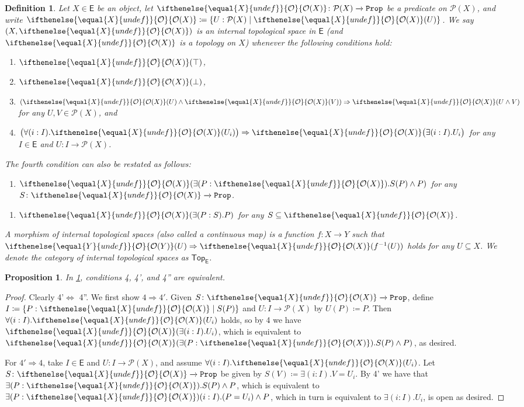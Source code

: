 \documentclass[reqno,11pt]{amsproc}
\theoremstyle{plain}
\newtheorem{proposition}[theorem]{Proposition}
\newtheorem{definition}[theorem]{Definition}
\theoremstyle{definition}
\newcommand{\Const}[1]{\mathtt{#1}}
\newcommand{\cat}[1]{\mathsf{#1}}
\newcommand{\Top}{\cat{Top}}
\renewcommand{\to}[1][]{\xrightarrow{#1}}
\newcommand{\pow}{\mathcal{P}}
\newcommand{\prop}{\Const{Prop}}
\newcommand{\Op}[1][undef]{\ifthenelse{\equal{#1}{undef}}{\mathcal{O}}{\mathcal{O}(#1)}}
\newcommand{\imp}{\Rightarrow}
\renewcommand{\iff}{\Leftrightarrow}
\numberwithin{equation}{section}
\begin{document}
\begin{definition}\label{def.internal_space}
	Let $X\in\cat{E}$ be an object, let $\Op[X]\colon\pow(X)\to\prop$ be a predicate on $\pow(X)$, and write $\Op[X]\coloneq\{U:\pow(X)\mid\Op[X](U)\}$. We say $(X,\Op[X])$ is an \emph{internal topological space in $\cat{E}$} (and $\Op[X]$ is a \emph{topology on $X$}) whenever the following conditions hold:
\begin{enumerate}
	\item $\Op[X](\top)$,
	\item $\Op[X](\bot)$,
	\item $(\Op[X](U)\wedge\Op[X](V))\imp \Op[X](U\wedge V)$ for any $U,V\in\pow(X)$, and
	\item $\big(\forall(i:I).\Op[X](U_i)\big)\imp\Op[X]\big(\exists(i:I).U_i\big)$ for any $I\in\cat{E}$ and $U\colon I\to\pow(X)$.
\end{enumerate}
The fourth condition can also be restated as follows:
\begin{enumerate}[label=4'.]
	\item $\Op[X](\exists(P:\Op[X]).S(P)\wedge P)$ for any $S\colon\Op[X]\to\prop$. 
\end{enumerate}
\begin{enumerate}[label=4''.]
	\item $\Op[X](\exists(P:S).P)$ for any $S\subseteq\Op[X]$.
\end{enumerate}

A \emph{morphism of internal topological spaces} (also called a \emph{continuous map}) is a function $f\colon X\to Y$ such that $\Op[Y](U)\imp\Op[X](f^{-1}(U))$ holds for any $U\subseteq X$. We denote the category of internal topological spaces as $\Top_\cat{E}$.
\end{definition}

\begin{proposition}
In \cref{def.internal_space}, conditions 4, 4', and 4'' are equivalent.
\end{proposition}
\begin{proof}
Clearly 4'$\iff$ 4''. We first show $4\imp 4'$. Given $S\colon\Op[X]\to\prop$, define $I\coloneqq\{P:\Op[X]\mid S(P)\}$ and $U\colon I\to\pow(X)$ by $U(P)\coloneqq P$. Then $\forall(i:I).\Op[X](U_i)$ holds, so by 4 we have $\Op[X](\exists(i:I).U_i)$, which is equivalent to $\Op[X](\exists(P:\Op[X]).S(P)\wedge P)$, as desired.

For $4'\imp 4$, take $I\in\cat{E}$ and $U\colon I\to\pow(X)$, and assume $\forall(i:I).\Op[X](U_i)$. Let $S\colon\Op[X]\to\prop$ be given by $S(V)\coloneqq\exists(i:I).V=U_i$. By 4' we have that $\exists(P:\Op[X]).S(P)\wedge P$, which is equivalent to $\exists(P:\Op[X])(i:I).(P=U_i)\wedge P$, which in turn is equivalent to $\exists(i:I).U_i$, is open as desired.
\end{proof}
\end{document}
